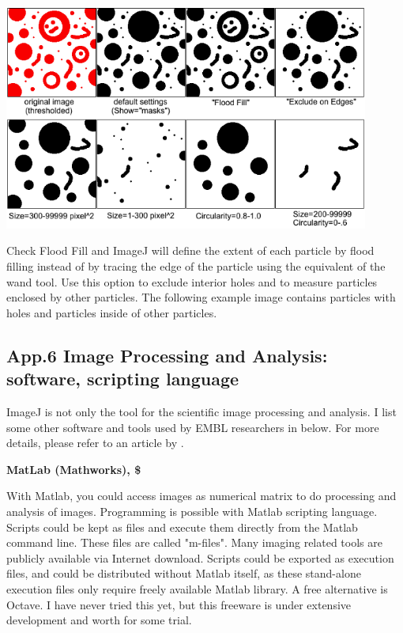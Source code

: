 \includegraphics[width=12cm]{fig/CMCIBasicCourse201102-img170.png}

Check Flood Fill and ImageJ will define the extent of each particle by
flood filling instead of by tracing the edge of the particle using the
equivalent of the wand tool. Use this option to exclude interior holes
and to measure particles enclosed by other particles. The following
example image contains particles with holes and particles inside of
other particles.


\clearpage

\subsection{App.6 Image Processing and Analysis: software, scripting language}
\label{app6}

ImageJ is not only the tool for the scientific image processing and
analysis. I list some other software and tools used by EMBL researchers in below. For more details, please refer to an article by \citet{WalterNATM2010}.

\textbf{MatLab (Mathworks), \$}

With Matlab, you could access images as numerical matrix to do
processing and analysis of images. Programming is possible with Matlab
scripting language. Scripts could be kept as files and execute them
directly from the Matlab command line. These files are called
"m-files". Many imaging related
tools are publicly available via Internet download. Scripts could be
exported as execution files, and could be distributed without Matlab
itself, as these stand-alone execution files only require freely
available Matlab library. A free alternative is Octave. I have never
tried this yet, but this freeware is under extensive development and
worth for some trial. 



